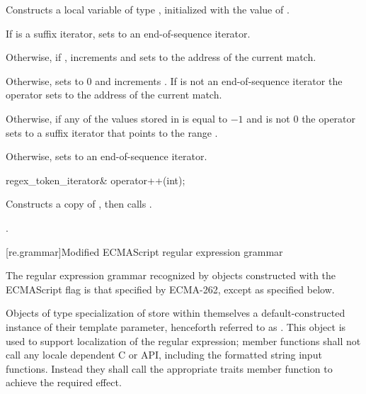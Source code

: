 \begin{itemdescr}
\pnum
\effects
Constructs a local variable  of
type , initialized with the value
of .

\pnum
If  is a suffix iterator, sets  to an
end-of-sequence iterator.

\pnum
Otherwise, if , increments  and
sets  to the address of the current match.

\pnum
Otherwise, sets  to 0 and
increments . If  is not an
end-of-sequence iterator the operator sets  to the
address of the current match.

\pnum
Otherwise, if any of the values stored in  is equal to $-1$ and
 is not 0 the operator sets  to a
suffix iterator that points to the range .

\pnum
Otherwise, sets  to an end-of-sequence iterator.

\pnum
\returns
{}
\end{itemdescr}

%
\begin{itemdecl}
regex_token_iterator& operator++(int);
\end{itemdecl}

\begin{itemdescr}
\pnum
\effects
Constructs a copy  of , then calls .

\pnum
\returns
{}.
\end{itemdescr}

[re.grammar]{Modified ECMAScript regular expression grammar}
%
%

\pnum
{}%
%
The regular expression grammar recognized by
 objects constructed with the ECMAScript
flag is that specified by ECMA-262, except as specified below.

\pnum
{}%
%
Objects of type specialization of  store within themselves a
default-constructed instance of their  template parameter, henceforth
referred to as . This  object is used to support localization
of the regular expression;  member functions shall not call
any locale dependent C or \Cpp{} API, including the formatted string input functions.
Instead they shall call the appropriate traits member function to achieve the required effect.

